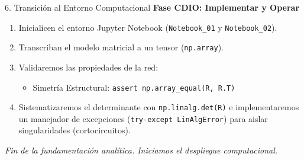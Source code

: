 \documentclass[aspectratio=169]{beamer}
\begin{document}
\begin{frame}{6. Transición al Entorno Computacional}
    \textbf{Fase CDIO: Implementar y Operar}
    \begin{enumerate}
        \item Inicialicen el entorno Jupyter Notebook (\texttt{Notebook\_01} y \texttt{Notebook\_02}).
        \item Transcriban el modelo matricial a un tensor (\texttt{np.array}).
        \item Validaremos las propiedades de la red:
        \begin{itemize}
            \item Simetría Estructural: \texttt{assert np.array\_equal(R, R.T)}
        \end{itemize}
        \item Sistematizaremos el determinante con \texttt{np.linalg.det(R)} e implementaremos un manejador de excepciones (\texttt{try-except LinAlgError}) para aislar singularidades (cortocircuitos).
    \end{enumerate}
    
    \vspace{0.3cm}
    \begin{center}
        \textit{Fin de la fundamentación analítica. Iniciamos el despliegue computacional.}
    \end{center}
\end{frame}
\end{document}
